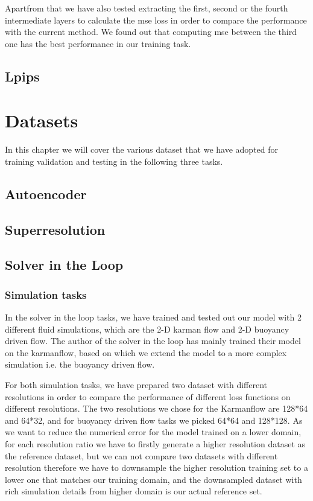 \documentclass[a4paper,12pt,twoside]{report}
\begin{document}
Apartfrom that we have also tested extracting the first, second or the fourth intermediate layers to calculate the mse loss in order to compare the performance with the current method. We found out that computing mse between the third one has the best performance in our training task.

\section{Lpips}





\chapter{Datasets}
In this chapter we will cover the various dataset that we have adopted for training validation and testing in the following three tasks.

\section{Autoencoder}


\section{Superresolution}

\section{Solver in the Loop}
\subsection{Simulation tasks}
In the solver in the loop tasks, we have trained and tested out our model with 2 different fluid simulations, which are the 2-D karman flow and 2-D buoyancy driven flow. The author of the solver in the loop has mainly trained their model on the karmanflow, based on which we extend the model to a more complex simulation i.e. the buoyancy driven flow. 

For both simulation tasks, we have prepared two dataset with different resolutions in order to compare the performance of different loss functions on different resolutions. The two resolutions we chose for the Karmanflow are 128*64 and 64*32, and for buoyancy driven flow tasks we picked 64*64 and 128*128. As we want to reduce the numerical error for the model trained on a lower domain, for each resolution ratio we have to firstly generate a higher resolution dataset as the reference dataset, but we can not compare two datasets with different resolution therefore we have to downsample the higher resolution training set to a lower one that matches our training domain, and the downsampled dataset with rich simulation details from higher domain is our actual reference set.
\end{document}

